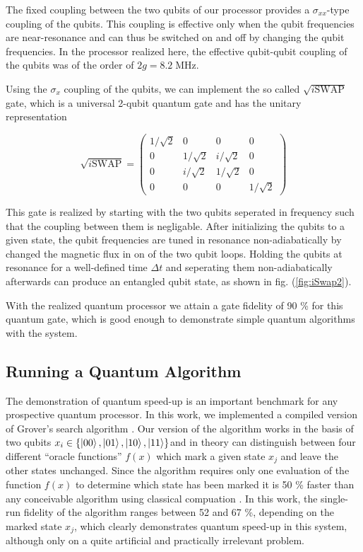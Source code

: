The fixed coupling between the two qubits of our processor provides a $\sigma_{xx}$-type coupling of the qubits. This coupling is effective only when the qubit frequencies are near-resonance and can thus be switched on and off by changing the qubit frequencies. In the processor realized here, the effective qubit-qubit coupling  of the qubits was of the order of $2g = 8.2 \; \mathrm{MHz}$.

Using the $\sigma_x$ coupling of the qubits, we can implement the so called $\sqrt{i\mathrm{SWAP}}$ gate, which is a universal 2-qubit quantum gate and has the unitary representation

\begin{equation}
	\sqrt{i\mathrm{SWAP}}  =  \left( \begin{array}{cccc} 1/\sqrt{2} & 0 & 0 & 0 \\ 0 & 1/\sqrt{2} & i/\sqrt{2} & 0 \\ 0 & i/\sqrt{2} & 1/\sqrt{2} & 0 \\ 0 & 0 & 0 & 1/\sqrt{2} \end{array} \right) \label{eq:sqrt_iswap_gate}
\end{equation}

This gate is realized by starting with the two qubits seperated in frequency such that the coupling between them is negligable. After initializing the qubits to a given state, the qubit frequencies are tuned in resonance non-adiabatically by changed the magnetic flux in on of the two qubit loops. Holding the qubits at resonance for a well-defined time $\Delta t$ and seperating them non-adiabatically afterwards can produce an entangled qubit state, as shown in fig. (\ref{fig:iSwap2}). 

With the realized quantum processor we attain a gate fidelity of 90 \% for this quantum gate, which is good enough to demonstrate simple quantum algorithms with the system.

\subsection{Running a Quantum Algorithm}

The demonstration of quantum speed-up is an important benchmark for any prospective quantum processor. In this work, we implemented a compiled version of Grover's search algorithm \citep{Grover_Quantum_1997}. Our version of the algorithm works in the basis of two qubits $x_i \in \{\left| 00 \right>,\left| 01 \right>,\left| 10 \right>,\left| 11 \right>\}$and in theory can distinguish between four different ``oracle functions'' $f(x)$ which mark a given state $x_j$ and leave the other states unchanged. Since the algorithm requires only one evaluation of the function $f(x)$ to determine which state has been marked it is 50 \% faster than any conceivable algorithm using classical compuation . In this work, the single-run fidelity of the algorithm ranges between 52 and 67 \%, depending on the marked state $x_j$, which clearly demonstrates quantum speed-up in this system, although only on a quite artificial and practically irrelevant problem.

